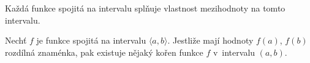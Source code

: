\begin{theorem}[O mezihodnotě]
Každá funkce spojitá na intervalu splňuje vlastnost
mezihodnoty na tomto intervalu.
\end{theorem}

\begin{corollary}
Nechť $f$ je funkce spojitá na intervalu
$\langle a,b\rangle$. Jestliže mají hodnoty
$f(a)$, $f(b)$ rozdílná znaménka,
pak existuje nějaký kořen funkce $f$
v~intervalu $(a,b)$.
\end{corollary}
